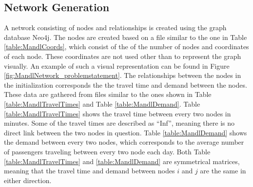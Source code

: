 \subsection{Network Generation}
\label{subsec:networkGeneration}

A network consisting of nodes and relationships is created using the graph database Neo4j. The nodes are created based on a file similar to the one in Table \vref{table:MandlCoords}, which consist of the of the number of nodes and coordinates of each node. These coordinates are not used other than to represent the graph visually. An example of such a visual representation can be found in Figure \vref{fig:MandlNetwork_problemstatement}. The relationships between the nodes in the initialization corresponds the the travel time and demand between the nodes. These data are gathered from files similar to the ones shown in Table 
\vref{table:MandlTravelTimes} and Table \vref{table:MandlDemand}. Table \ref{table:MandlTravelTimes} shows the travel time between every two nodes in minutes. Some of the travel times are described as ``Inf'', meaning there is no direct link between the two nodes in question. Table \ref{table:MandlDemand} shows the demand between every two nodes, which corresponds to the average number of passengers traveling between every two node each day. Both Table \ref{table:MandlTravelTimes} and \ref{table:MandlDemand} are symmetrical matrices, meaning that the travel time and demand between nodes $i$ and $j$ are the same in either direction. 

